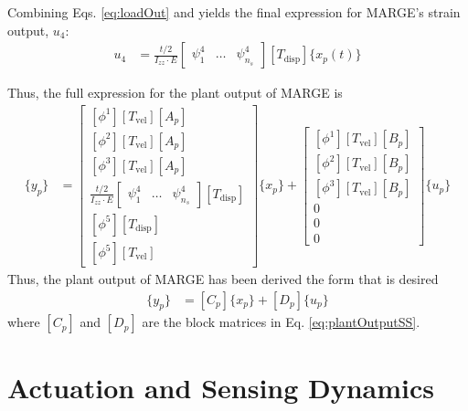 Combining Eqs. \ref{eq:loadOut} and \label{eq:beamTheory} yields the final expression for MARGE's strain output, $u_4$:
\begin{align}
	u_4 &= \frac{t/2}{I_{zz} \cdot E} \begin{bmatrix} \psi_1^4 & \dots & \psi_{n_s}^4 \end{bmatrix} [T_\text{disp}] \{x_p(t)\}
\end{align}

Thus, the full expression for the plant output of MARGE is
\begin{align}
	\label{eq:plantOutputSS}
	\{y_p\} &= \begin{bmatrix}
		\left[ \phi^1 \right] [T_\text{vel}] [A_p] \\
		\left[ \phi^2 \right] [T_\text{vel}] [A_p] \\
		\left[ \phi^3 \right] [T_\text{vel}] [A_p] \\
		\frac{t/2}{I_{zz} \cdot E} \begin{bmatrix} \psi_1^4 & \dots & \psi_{n_s}^4 \end{bmatrix} [T_\text{disp}] \\
		\left[ \phi^5 \right] [T_\text{disp}] \\
		\left[ \phi^5 \right] [T_\text{vel}]
	\end{bmatrix} \{x_p\} + \begin{bmatrix}
		\left[ \phi^1 \right] [T_\text{vel}] [B_p] \\
		\left[ \phi^2 \right] [T_\text{vel}] [B_p] \\
		\left[ \phi^3 \right] [T_\text{vel}] [B_p] \\
		0 \\ 0 \\ 0
	\end{bmatrix}  \{u_p\}
\end{align}
Thus, the plant output of MARGE has been derived the form that is desired
\begin{align}
	\{y_p\} &= [C_p] \{x_p\} + [D_p] \{u_p\}
\end{align}
where $[C_p]$ and $[D_p]$ are the block matrices in Eq. \ref{eq:plantOutputSS}.

\section{Actuation and Sensing Dynamics} %

